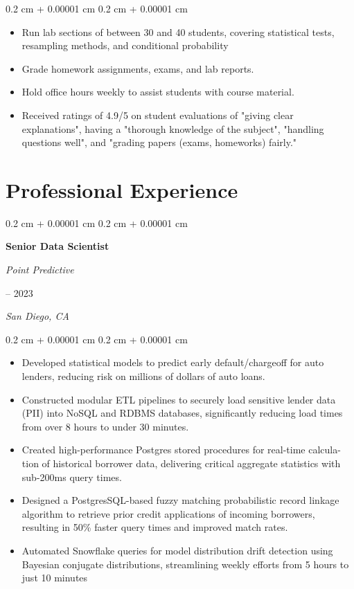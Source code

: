 \documentclass[11pt, letterpaper]{article}
\newenvironment{highlights}{
    \begin{itemize}[
        topsep=0.10 cm,
        parsep=0.10 cm,
        partopsep=0pt,
        itemsep=0pt,
        leftmargin=0.4 cm + 10pt
    ]
}{
    \end{itemize}
} %
\newenvironment{onecolentry}{
    \begin{adjustwidth}{
        0.2 cm + 0.00001 cm
    }{
        0.2 cm + 0.00001 cm
    }
}{
    \end{adjustwidth}
} %
\newenvironment{twocolentry}[2][]{
    \onecolentry
    \def\secondColumn{#2}
    \setcolumnwidth{\fill, 4.5 cm}
    \begin{paracol}{2}
}{
    \switchcolumn \raggedleft \secondColumn
    \end{paracol}
    \endonecolentry
} %
\begin{document}
\vspace{0.05 cm}
\begin{onecolentry}
    \begin{highlights}
        \item Run lab sections of between 30 and 40 students, covering statistical tests, resampling methods, and conditional probability
        \item Grade homework assignments, exams, and lab reports.
        \item Hold office hours weekly to assist students with course material.
        \item Received ratings of 4.9/5 on student evaluations of "giving clear explanations", having a "thorough knowledge of the subject", "handling questions well", and "grading papers (exams, homeworks) fairly."
    \end{highlights}
\end{onecolentry}



\section{Professional Experience}

\begin{twocolentry}{
        2021 – 2023

        \textit{San Diego, CA}
    }
    \textbf{Senior Data Scientist}

    \textit{Point Predictive}
\end{twocolentry}

\begin{onecolentry}
    \begin{highlights}
        \item Developed statistical models to predict early default/chargeoﬀ for auto lenders,
        reducing risk on millions of dollars of auto loans.
        \item Constructed modular ETL pipelines to securely load sensitive lender data (PII)
        into NoSQL and RDBMS databases, signiﬁcantly reducing load times from over 8
        hours to under 30 minutes.
        \item Created high-performance Postgres stored procedures for real-time calcula-
        tion of historical borrower data, delivering critical aggregate statistics with
        sub-200ms query times.
        \item Designed a PostgresSQL-based fuzzy matching probabilistic record linkage
        algorithm to retrieve prior credit applications of incoming borrowers, resulting
        in 50\% faster query times and improved match rates.
        \item Automated Snowﬂake queries for model distribution drift detection using Bayesian conjugate distributions,
        streamlining weekly eﬀorts from 5 hours to just 10 minutes
    \end{highlights}
\end{onecolentry}
\end{document}
